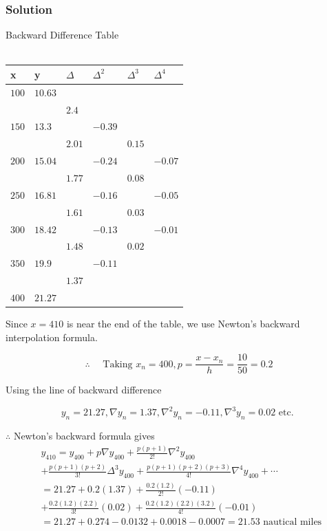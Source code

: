 \documentclass{beamer}
\begin{document}
\begin{frame}
\frametitle{Solution}
\begin{table}
Backward Difference Table\\\\
\centering
\begin{tabular}{|l|l|l|l|l|l|} 
\hline
\textbf{x}     & \textbf{y}       &\textbf{$\Delta$}       & \textbf{$\Delta^2$}      & \textbf{$\Delta^3$}     & \textbf{$\Delta^4$}       \\ 
\hline
$100$ & $10.63$ &        &         &        &          \\ 
\hline
      &         & $2.4$  &         &        &          \\ 
\hline
$150$ & $13.3$  &        & $-0.39$ &        &          \\ 
\hline
      &         & $2.01$ &         & $0.15$ &          \\ 
\hline
$200$ & $15.04$ &        & $-0.24$ &        & $-0.07$  \\ 
\hline
      &         & $1.77$ &         & $0.08$ &          \\ 
\hline
$250$ & $16.81$ &        & $-0.16$ &        & $-0.05$  \\ 
\hline
      &         & $1.61$ &         & $0.03$ &          \\ 
\hline
$300$ & $18.42$ &        & $-0.13$ &        & $-0.01$  \\ 
\hline
      &         & $1.48$ &         & $0.02$ &          \\ 
\hline
$350$ & $19.9$  &        & $-0.11$ &        &          \\ 
\hline
      &         & $1.37$ &         &        &          \\ 
\hline
$400$ & $21.27$ &        &         &        &          \\
\hline
\end{tabular}
\end{table}
\end{frame}
\begin{frame}
Since $x=410$ is near the end of the table, we use Newton's backward interpolation formula.

$$
\therefore \quad \text { Taking } x_{n}=400, p=\frac{x-x_{n}}{h}=\frac{10}{50}=0.2
$$

Using the line of backward difference

$$
y_{n}=21.27, \nabla y_{n}=1.37, \nabla^{2} y_{n}=-0.11, \nabla^{3} y_{n}=0.02 \text { etc. }
$$

$\therefore$ Newton's backward formula gives
$$
\begin{aligned}
& y_{410}=y_{400}+p \nabla y_{400}+\frac{p(p+1)}{2 !} \nabla^{2} y_{400} \\
& +\frac{p(p+1)(p+2)}{3 !} \Delta^{3} y_{400}+\frac{p(p+1)(p+2)(p+3)}{4 !} \nabla^{4} y_{400}+\cdots \\
& =21.27+0.2(1.37)+\frac{0.2(1.2)}{2 !}(-0.11) \\
& +\frac{0.2(1.2)(2.2)}{3 !}(0.02)+\frac{0.2(1.2)(2.2)(3.2)}{4 !}(-0.01) \\
& =21.27+0.274-0.0132+0.0018-0.0007 =21.53 \text { nautical miles }
\end{aligned}
$$
\end{frame}
\end{document}
